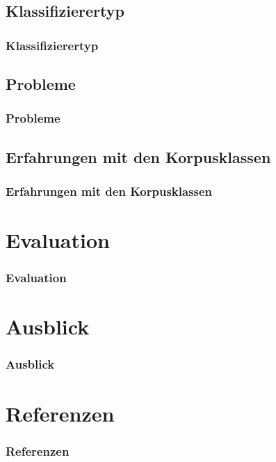 \documentclass{beamer}
\begin{document}
	\subsection{Klassifizierertyp}
	\begin{frame}
		\frametitle{Klassifizierertyp}
		
	\end{frame}
	\subsection{Probleme}
	\begin{frame}
		\frametitle{Probleme}
		
	\end{frame}
	\subsection{Erfahrungen mit den Korpusklassen}
	\begin{frame}
		\frametitle{Erfahrungen mit den Korpusklassen}
		
	\end{frame}
\section{Evaluation}
	\begin{frame}
		\frametitle{Evaluation}
		
	\end{frame}
\section{Ausblick}
	\begin{frame}
		\frametitle{Ausblick}
		
	\end{frame}
\section{Referenzen}
	\begin{frame}
		\frametitle{Referenzen}
		
		\end{frame}
\end{document}
